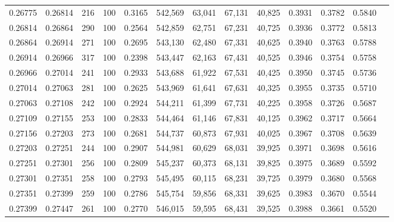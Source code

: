\begin{tabular}{rrrrrrrrrrrrr}
0.26775 & 0.26814 &   216 & 100 &                                     0.3165 & 542,569 &  63,041 &  67,131 &  40,825 & 0.3931 & 0.3782 & 0.5840 \\
0.26814 & 0.26864 &   290 & 100 &                                     0.2564 & 542,859 &  62,751 &  67,231 &  40,725 & 0.3936 & 0.3772 & 0.5813 \\
0.26864 & 0.26914 &   271 & 100 &                                     0.2695 & 543,130 &  62,480 &  67,331 &  40,625 & 0.3940 & 0.3763 & 0.5788 \\
0.26914 & 0.26966 &   317 & 100 &                                     0.2398 & 543,447 &  62,163 &  67,431 &  40,525 & 0.3946 & 0.3754 & 0.5758 \\
0.26966 & 0.27014 &   241 & 100 &                                     0.2933 & 543,688 &  61,922 &  67,531 &  40,425 & 0.3950 & 0.3745 & 0.5736 \\
0.27014 & 0.27063 &   281 & 100 &                                     0.2625 & 543,969 &  61,641 &  67,631 &  40,325 & 0.3955 & 0.3735 & 0.5710 \\
0.27063 & 0.27108 &   242 & 100 &                                     0.2924 & 544,211 &  61,399 &  67,731 &  40,225 & 0.3958 & 0.3726 & 0.5687 \\
0.27109 & 0.27155 &   253 & 100 &                                     0.2833 & 544,464 &  61,146 &  67,831 &  40,125 & 0.3962 & 0.3717 & 0.5664 \\
0.27156 & 0.27203 &   273 & 100 &                                     0.2681 & 544,737 &  60,873 &  67,931 &  40,025 & 0.3967 & 0.3708 & 0.5639 \\
0.27203 & 0.27251 &   244 & 100 &                                     0.2907 & 544,981 &  60,629 &  68,031 &  39,925 & 0.3971 & 0.3698 & 0.5616 \\
0.27251 & 0.27301 &   256 & 100 &                                     0.2809 & 545,237 &  60,373 &  68,131 &  39,825 & 0.3975 & 0.3689 & 0.5592 \\
0.27301 & 0.27351 &   258 & 100 &                                     0.2793 & 545,495 &  60,115 &  68,231 &  39,725 & 0.3979 & 0.3680 & 0.5568 \\
0.27351 & 0.27399 &   259 & 100 &                                     0.2786 & 545,754 &  59,856 &  68,331 &  39,625 & 0.3983 & 0.3670 & 0.5544 \\
0.27399 & 0.27447 &   261 & 100 &                                     0.2770 & 546,015 &  59,595 &  68,431 &  39,525 & 0.3988 & 0.3661 & 0.5520 \\

\end{tabular}
